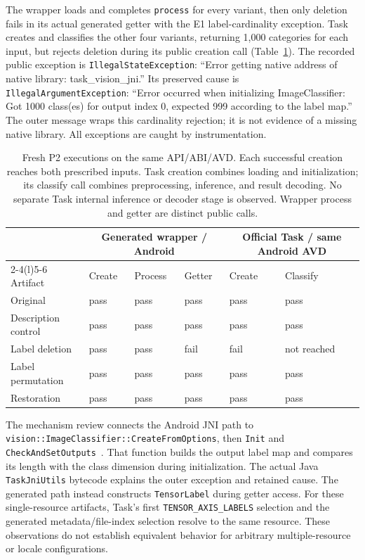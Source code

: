 \documentclass[10pt,twocolumn,letterpaper]{article}
\newcommand{\code}[1]{\texttt{#1}}
\begin{document}
The wrapper loads and completes \code{process} for every variant, then only deletion fails in its actual generated getter with the E1 label-cardinality exception. Task creates and classifies the other four variants, returning 1,000 categories for each input, but rejects deletion during its public creation call (Table~\ref{tab:stages}). The recorded public exception is \code{IllegalStateException}: ``Error getting native address of native library: task\_vision\_jni.'' Its preserved cause is \code{IllegalArgumentException}: ``Error occurred when initializing ImageClassifier: Got 1000 class(es) for output index 0, expected 999 according to the label map.'' The outer message wraps this cardinality rejection; it is not evidence of a missing native library. All exceptions are caught by instrumentation.

\begin{table}[t]
\centering\small
\setlength{\tabcolsep}{8pt}
\begin{tabular}{@{}llllll@{}}
\toprule
 & \multicolumn{3}{c}{Generated wrapper / Android} & \multicolumn{2}{c}{Official Task / same Android AVD}\\
\cmidrule(lr){2-4}\cmidrule(l){5-6}
Artifact & Create & Process & Getter & Create & Classify\\
\midrule
Original & pass & pass & pass & pass & pass\\
Description control & pass & pass & pass & pass & pass\\
Label deletion & pass & pass & fail & fail & not reached\\
Label permutation & pass & pass & pass & pass & pass\\
Restoration & pass & pass & pass & pass & pass\\
\bottomrule
\end{tabular}
\caption{Fresh P2 executions on the same API/ABI/AVD. Each successful creation reaches both prescribed inputs. Task creation combines loading and initialization; its classify call combines preprocessing, inference, and result decoding. No separate Task internal inference or decoder stage is observed. Wrapper process and getter are distinct public calls.}
\label{tab:stages}
\end{table}

The mechanism review connects the Android JNI path to \code{vision::ImageClassifier::CreateFromOptions}, then \code{Init} and \code{CheckAndSetOutputs}~\cite{task-classifier}. That function builds the output label map and compares its length with the class dimension during initialization. The actual Java \code{TaskJniUtils} bytecode explains the outer exception and retained cause. The generated path instead constructs \code{TensorLabel} during getter access. For these single-resource artifacts, Task's first \code{TENSOR\_AXIS\_LABELS} selection and the generated metadata/file-index selection resolve to the same resource. These observations do not establish equivalent behavior for arbitrary multiple-resource or locale configurations.
\end{document}
